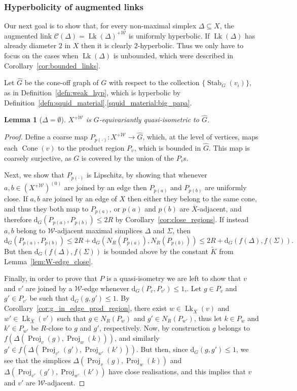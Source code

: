 \documentclass[svgnames]{amsart}
\theoremstyle{plain}
\newtheorem{lemma}[thm]{Lemma}
\theoremstyle{definition}
\newcommand{\C}{\mathcal C}
\newcommand{\ov}[1]{\overline{#1}}
\newcommand{\dist}{\mathrm{d}}
\newcommand{\link}{\operatorname{Lk}}
\newcommand{\Stab}[2]{\operatorname{Stab}_{#1}(#2)}
\newcommand{\Proj}{\operatorname{Proj}}
\newcommand{\W}{\mathcal{W}}
\newcommand{\h}{\widehat}
\newcommand{\Squid}{\operatorname{Cone}}
\begin{document}
\subsubsection{Hyperbolicity of augmented links}\label{subsec_link_hyp}
Our next goal is to show that, for every non-maximal simplex $\Delta\subseteq X$, the augmented link $\C(\Delta)=\link(\Delta)^{+\W}$ is uniformly hyperbolic. If $\link(\Delta)$ has already diameter $2$ in $X$ then it is clearly $2$-hyperbolic. Thus we only have to focus on the cases when $\link(\Delta)$ is unbounded, which were described in Corollary~\ref{cor:bounded_links}.
\par\medskip
Let $\h G$ be the cone-off graph of $G$ with respect to the collection $\{\Stab{G}{v_i}\}$, as in Definition~\ref{defn:weak_hyp}, which is hyperbolic by Definition~\ref{defn:squid_material}.\eqref{squid_material:big_papa}.
\begin{lemma}[$\Delta=\emptyset$]\label{lem:CS_qi_to_squidoff}
    $X^{+\W}$ is $G$-equivariantly quasi-isometric to $\h G$.
\end{lemma}

\begin{proof}
    Define a coarse map $P_{p(\cdot)}\colon X^{+\W}\to \h G$, which, at the level of vertices, maps each $\Squid(v)$ to the product region $P_v$, which is bounded in $\h G$. This map is coarsely surjective, as $G$ is covered by the union of the $P_v$s.

    Next, we show that $P_{p(\cdot)}$ is Lipschitz, by showing that whenever $a,b\in (X^{+\W})^{(0)}$ are joined by an edge then $P_{p(a)}$ and $P_{p(b)}$ are uniformly close. If $a,b$ are joined by an edge of $X$ then either they belong to the same cone, and thus they both map to $P_{p(a)}$, or $p(a)$ and $p(b)$ are $\ov{X}$-adjacent, and therefore $\dist_G(P_{p(a)}, P_{p(b)})\le 2R$ by Corollary~\ref{cor:close_regions}. If instead $a,b$ belong to $\W$-adjacent maximal simplices $\Delta$ and $\Sigma$, then
    $$\dist_G(P_{p(a)}, P_{p(b)})\le 2R+\dist_G(N_R(P_{p(a)}), N_R(P_{p(b)}))\le 2R+\dist_G(f(\Delta), f(\Sigma)).$$
    But then $\dist_G(f(\Delta), f(\Sigma))$ is bounded above by the constant $\widetilde{K}$ from Lemma~\ref{lem:W-edge_close}.
\par\medskip
    Finally, in order to prove that $P$ is a quasi-isometry we are left to show that  $v$ and $v'$ are joined by a $\W$-edge whenever $\dist_G(P_v,P_{v'})\le 1$,. Let $g\in P_v$ and $g'\in P_{v'}$ be such that $\dist_G(g,g')\le 1$. By Corollary~\ref{cor:g_in_edge_prod_region}, there exist $w\in\link_{\ov X}(v)$ and $w'\in\link_{\ov X}(v')$ such that $g\in N_R(P_w)$ and $g'\in N_R(P_{w'})$, thus let $k\in P_w$ and $k'\in P_{w'}$ be $R$-close to $g$ and $g'$, respectively. Now, by construction $g$ belongs to $f(\Delta(\Proj_v(g),\Proj_w(k)))$, and similarly $g'\in f(\Delta(\Proj_{v'}(g'),\Proj_{w'}(k')))$. But then, since $\dist_G(g,g')\le 1$, we see that the simplices $\Delta(\Proj_v(g),\Proj_w(k))$ and $\Delta(\Proj_{v'}(g'),\Proj_{w'}(k'))$ have close realisations, and this implies that $v$ and $v'$ are $\W$-adjacent.
\end{proof}
\end{document}

